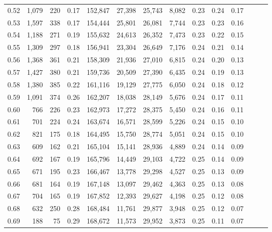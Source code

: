 \begin{tabular}{rrrrrrrrrrrrrr}
0.52 &   1,079 &    220 &  0.17 &  152,847 &   27,398 &  25,743 &   8,082 &  0.23 &  0.24 &      0.17 \\
0.53 &   1,597 &    338 &  0.17 &  154,444 &   25,801 &  26,081 &   7,744 &  0.23 &  0.23 &      0.16 \\
0.54 &   1,188 &    271 &  0.19 &  155,632 &   24,613 &  26,352 &   7,473 &  0.23 &  0.22 &      0.15 \\
0.55 &   1,309 &    297 &  0.18 &  156,941 &   23,304 &  26,649 &   7,176 &  0.24 &  0.21 &      0.14 \\
0.56 &   1,368 &    361 &  0.21 &  158,309 &   21,936 &  27,010 &   6,815 &  0.24 &  0.20 &      0.13 \\
0.57 &   1,427 &    380 &  0.21 &  159,736 &   20,509 &  27,390 &   6,435 &  0.24 &  0.19 &      0.13 \\
0.58 &   1,380 &    385 &  0.22 &  161,116 &   19,129 &  27,775 &   6,050 &  0.24 &  0.18 &      0.12 \\
0.59 &   1,091 &    374 &  0.26 &  162,207 &   18,038 &  28,149 &   5,676 &  0.24 &  0.17 &      0.11 \\
0.60 &     766 &    226 &  0.23 &  162,973 &   17,272 &  28,375 &   5,450 &  0.24 &  0.16 &      0.11 \\
0.61 &     701 &    224 &  0.24 &  163,674 &   16,571 &  28,599 &   5,226 &  0.24 &  0.15 &      0.10 \\
0.62 &     821 &    175 &  0.18 &  164,495 &   15,750 &  28,774 &   5,051 &  0.24 &  0.15 &      0.10 \\
0.63 &     609 &    162 &  0.21 &  165,104 &   15,141 &  28,936 &   4,889 &  0.24 &  0.14 &      0.09 \\
0.64 &     692 &    167 &  0.19 &  165,796 &   14,449 &  29,103 &   4,722 &  0.25 &  0.14 &      0.09 \\
0.65 &     671 &    195 &  0.23 &  166,467 &   13,778 &  29,298 &   4,527 &  0.25 &  0.13 &      0.09 \\
0.66 &     681 &    164 &  0.19 &  167,148 &   13,097 &  29,462 &   4,363 &  0.25 &  0.13 &      0.08 \\
0.67 &     704 &    165 &  0.19 &  167,852 &   12,393 &  29,627 &   4,198 &  0.25 &  0.12 &      0.08 \\
0.68 &     632 &    250 &  0.28 &  168,484 &   11,761 &  29,877 &   3,948 &  0.25 &  0.12 &      0.07 \\
0.69 &     188 &     75 &  0.29 &  168,672 &   11,573 &  29,952 &   3,873 &  0.25 &  0.11 &      0.07 \\

\end{tabular}
